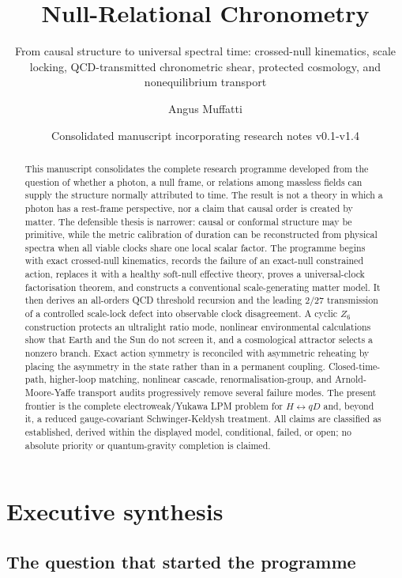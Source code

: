\documentclass[
]{article}
\title{Null-Relational Chronometry}
\subtitle{From causal structure to universal spectral time: crossed-null
kinematics, scale locking, QCD-transmitted chronometric shear, protected
cosmology, and nonequilibrium transport}
\author{Angus Muffatti}
\date{Consolidated manuscript incorporating research notes v0.1-v1.4}
\begin{document}
\maketitle
\begin{abstract}
This manuscript consolidates the complete research programme developed
from the question of whether a photon, a null frame, or relations among
massless fields can supply the structure normally attributed to time.
The result is not a theory in which a photon has a rest-frame
perspective, nor a claim that causal order is created by matter. The
defensible thesis is narrower: causal or conformal structure may be
primitive, while the metric calibration of duration can be reconstructed
from physical spectra when all viable clocks share one local scalar
factor. The programme begins with exact crossed-null kinematics, records
the failure of an exact-null constrained action, replaces it with a
healthy soft-null effective theory, proves a universal-clock
factorisation theorem, and constructs a conventional scale-generating
matter model. It then derives an all-orders QCD threshold recursion and
the leading \(2/27\) transmission of a controlled scale-lock defect into
observable clock disagreement. A cyclic \(Z_6\) construction protects an
ultralight ratio mode, nonlinear environmental calculations show that
Earth and the Sun do not screen it, and a cosmological attractor selects
a nonzero branch. Exact action symmetry is reconciled with asymmetric
reheating by placing the asymmetry in the state rather than in a
permanent coupling. Closed-time-path, higher-loop matching, nonlinear
cascade, renormalisation-group, and Arnold-Moore-Yaffe transport audits
progressively remove several failure modes. The present frontier is the
complete electroweak/Yukawa LPM problem for \(H\leftrightarrow qD\) and,
beyond it, a reduced gauge-covariant Schwinger-Keldysh treatment. All
claims are classified as established, derived within the displayed
model, conditional, failed, or open; no absolute priority or
quantum-gravity completion is claimed.
\end{abstract}

{
\setcounter{tocdepth}{2}
\tableofcontents
}
\newpage

\section{Executive synthesis}\label{executive-synthesis}

\subsection{The question that started the
programme}\label{the-question-that-started-the-programme}
\end{document}
